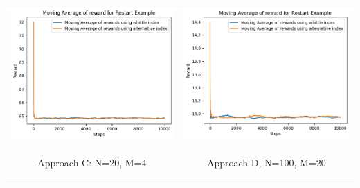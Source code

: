 \documentclass{slides}
\begin{document}
{\begin{center}
\begin{tabular}{cc}
\includegraphics[scale=0.6]{homo_restart_compariosn_C.png} &
\includegraphics[scale=0.6]{comparison_homo_restart_D.png} \\
\begin{small}
 Approach C: N=20, M=4\end{small} & \begin{small}Approach D, N=100, M=20\end{small}\\
 \end{tabular}

\end{center}
    
}
\end{document}
